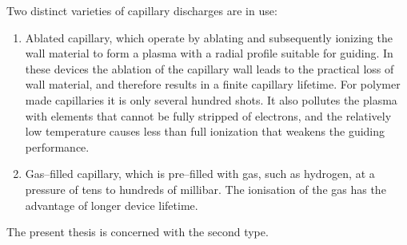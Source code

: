 \documentclass[../main.tex]{subfiles}
\begin{document}
Two distinct varieties of capillary discharges are in use:
\begin{enumerate}
    \item Ablated capillary, which operate by ablating and subsequently ionizing the wall material to form a plasma with a radial profile suitable for guiding\cite{Ehrlich1996GuidingExperiments,Ferber2019GuidingChannels,Hooker2000GuidingWaveguide}. In these devices the ablation of the capillary wall leads to the practical loss of wall material, and therefore results in a finite capillary lifetime. For polymer made capillaries it is only several hundred shots. It also pollutes the plasma with elements that cannot be fully stripped of electrons, and the relatively low temperature causes less than full ionization that weakens the guiding performance.

    \item Gas--filled capillary, which is pre--filled with gas, such as hydrogen, at a pressure of tens to hundreds of  millibar\cite{Spence2001InvestigationWaveguide}. The ionisation of the gas has the advantage of longer device lifetime.
\end{enumerate}
The present thesis is concerned with the second type.
\end{document}
